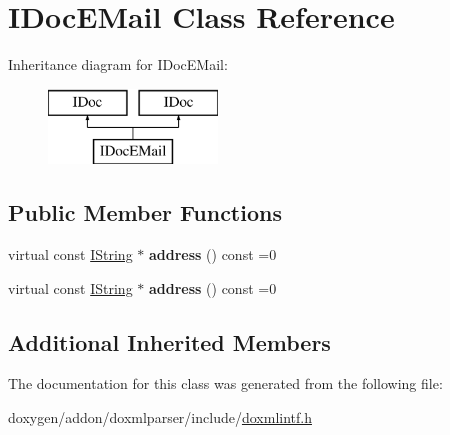 \hypertarget{class_i_doc_e_mail}{}\section{I\+Doc\+E\+Mail Class Reference}
\label{class_i_doc_e_mail}
Inheritance diagram for I\+Doc\+E\+Mail\+:\begin{figure}[H]
\begin{center}
\leavevmode
\includegraphics[height=2.000000cm]{class_i_doc_e_mail}
\end{center}
\end{figure}
\subsection*{Public Member Functions}
\begin{DoxyCompactItemize}
\item 
\mbox{\label{class_i_doc_e_mail_acf2fb22fdfabd4a0aa19ae7fa50b33b5}} 
virtual const \mbox{\hyperlink{class_i_string}{I\+String}} $\ast$ {\bfseries address} () const =0
\item 
\mbox{\label{class_i_doc_e_mail_acf2fb22fdfabd4a0aa19ae7fa50b33b5}} 
virtual const \mbox{\hyperlink{class_i_string}{I\+String}} $\ast$ {\bfseries address} () const =0
\end{DoxyCompactItemize}
\subsection*{Additional Inherited Members}


The documentation for this class was generated from the following file\+:\begin{DoxyCompactItemize}
\item 
doxygen/addon/doxmlparser/include/\mbox{\hyperlink{include_2doxmlintf_8h}{doxmlintf.\+h}}\end{DoxyCompactItemize}
